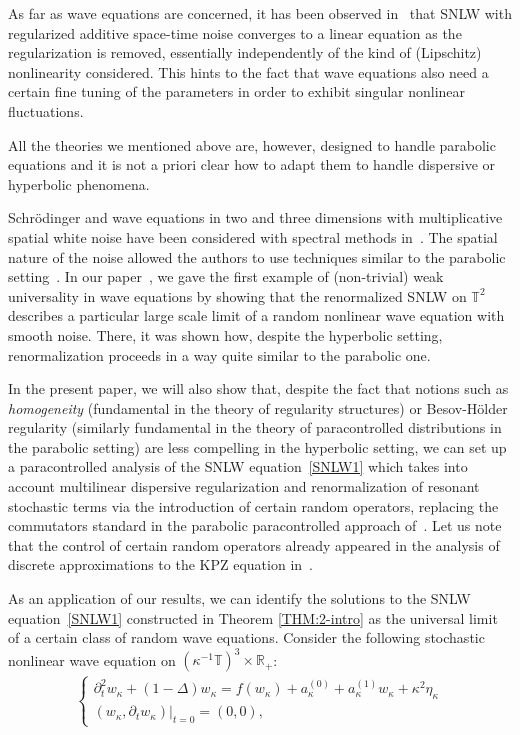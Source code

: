 \documentclass[%
11pt,  reqno]{amsart}
\newcommand{\1}{\hspace{0.2mm}\text{I}\hspace{0.2mm}}
\newcommand{\R}{\mathbb{R}}
\newcommand{\T}{\mathbb{T}}
\newcommand{\Dl}{\Delta}
\newcommand{\kk}{\kappa}
\newcommand{\dt}{\partial_t}
\numberwithin{equation}{section}
\numberwithin{theorem}{section}
\begin{document}
As far as wave equations are concerned, it has been observed in~\cite{russo2, russo4, russo1, russo3} that SNLW with regularized additive space-time noise converges to a linear equation as the regularization is removed, essentially independently of the kind of (Lipschitz) nonlinearity considered. This hints to the fact that 
wave equations also need a certain fine tuning of the parameters in order to exhibit singular nonlinear fluctuations. 

All the theories we mentioned above are, however,  designed to handle parabolic equations and 
it is not a priori clear how to adapt them to handle dispersive or hyperbolic phenomena. 

Schr\"odinger and wave equations in two and three dimensions with multiplicative spatial white noise have been considered with spectral methods in~\cite{debussche_schrodinger_2018, debussche_solution_2017, gubinelli_semilinear_2018}. The spatial nature of the noise allowed the authors
 to use techniques similar to the parabolic setting~\cite{allez_continuous_2015}.
%
In our  paper~\cite{GKO}, we gave the first example of (non-trivial) weak universality in wave equations by showing that the renormalized SNLW on $\mathbb{T}^2$ describes a particular large scale limit of a random nonlinear wave equation with smooth noise. 
There, it was shown how, despite the hyperbolic setting, renormalization proceeds in a way quite similar to the parabolic one. 

In the present paper, we will also show that, despite the fact that notions such as  \emph{homogeneity} 
(fundamental in the theory of regularity structures) or Besov-H\"older regularity 
(similarly fundamental in the theory of  paracontrolled distributions in the parabolic setting) are less compelling in the hyperbolic setting, we can set up a paracontrolled analysis of
the SNLW equation~\eqref{SNLW1} 
which takes into account multilinear dispersive regularization and renormalization of resonant  stochastic terms via the introduction of certain random operators,
 replacing the  commutators standard in the parabolic paracontrolled approach of~\cite{GIP}. Let us note that the control of certain random operators already appeared in the analysis of discrete approximations to 
 the KPZ equation in~\cite{GP1}. 


As an application of our results, we can identify the solutions to the SNLW equation~\eqref{SNLW1} 
constructed in Theorem \ref{THM:2-intro} as the universal limit of a certain class of random wave equations. 
Consider the following stochastic nonlinear wave equation
on $(\kk^{-1} \T)^3 \times \R_+$:
\begin{align}
\begin{cases}
\partial_t^2 w_{\kk}  + (1 - \Dl) w_{\kk} = f (w_{\kk})
   + a_{\kk}^{(0)} + a_{\kk}^{(1)} w_{\kk} +
   {\kk}^2 \eta_{\kk} \\
(w_{\kk}, \dt w_{\kk})|_{t = 0} = (0, 0), 
\end{cases}
\label{weq}
\end{align}
\end{document}
